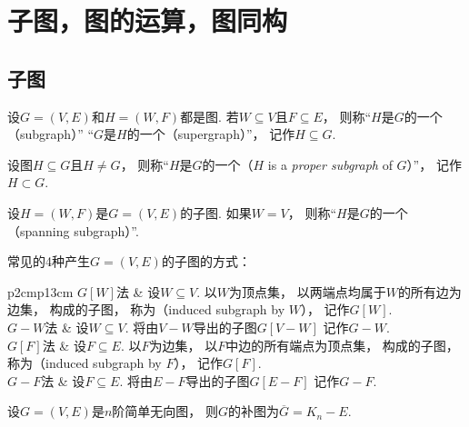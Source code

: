 \section{子图，图的运算，图同构}
\subsection{子图}
\begin{definition}
设\(G = (V,E)\)和\(H = (W,F)\)都是图.
若\(W \subseteq V\)且\(F \subseteq E\)，
则称“\(H\)是\(G\)的一个（subgraph）”
“\(G\)是\(H\)的一个（supergraph）”，
记作\(H \subseteq G\).
\end{definition}

\begin{definition}
设图\(H \subseteq G\)且\(H \neq G\)，
则称“\(H\)是\(G\)的一个（\(H\) is a \emph{proper subgraph} of \(G\)）”，
记作\(H \subset G\).
\end{definition}

\begin{definition}
设\(H = (W,F)\)是\(G = (V,E)\)的子图.
如果\(W = V\)，
则称“\(H\)是\(G\)的一个（spanning subgraph）”.
\end{definition}

常见的4种产生\(G = (V,E)\)的子图的方式：
\begin{center}
\begin{tblr}{p{2cm}p{13cm}}
	{\(G[W]\)法} &
	设\(W \subseteq V\).
	以\(W\)为顶点集，
	以两端点均属于\(W\)的所有边为边集，
	构成的子图，
	称为（induced subgraph by \(W\)），
	记作\(G[W]\).
	\\
	{\(G-W\)法} &
	设\(W \subseteq V\).
	将由\(V-W\)导出的子图\(G[V-W]\)
	记作\(G-W\).
	\\
	{\(G[F]\)法} &
	设\(F \subseteq E\).
	以\(F\)为边集，
	以\(F\)中边的所有端点为顶点集，
	构成的子图，
	称为（induced subgraph by \(F\)），
	记作\(G[F]\).
	\\
	{\(G-F\)法} &
	设\(F \subseteq E\).
	将由\(E-F\)导出的子图\(G[E-F]\)
	记作\(G-F\).
	\\
\end{tblr}
\end{center}

\begin{proposition}
设\(G = (V,E)\)是\(n\)阶简单无向图，
则\(G\)的补图为\(\overline{G} = K_n - E\).
\end{proposition}

